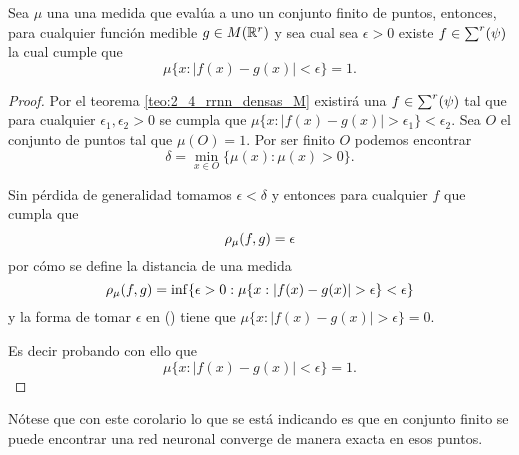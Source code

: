 \begin{corolario} \label{corolario:2_4_conjunto_finito}
    Sea $\mu$ una una medida que evalúa a uno un conjunto 
    finito de puntos, 
    entonces, para cualquier función medible $g \in M(\mathbb{R}^r)$
    y sea cual sea $\epsilon >0$ 
    existe $f \in \sum^r (\psi)$ la cual cumple que 
    \begin{equation}
        \mu\{ 
            x:
            |f(x) - g(x)| 
            < \epsilon
        \}
        = 1.
    \end{equation}

\end{corolario}
\begin{proof}
    Por el teorema \ref{teo:2_4_rrnn_densas_M} existirá una 
    $f \in \sum^r (\psi)$ tal que para cualquier 
    $\epsilon_1, \epsilon_2 >0$ se cumpla que 
    $\mu \{x: |f(x) - g(x)| > \epsilon_1\} < \epsilon_2.$
    Sea $O$ el conjunto de puntos tal que $\mu(O) = 1.$
    Por ser finito $O$ podemos encontrar
    \begin{equation} \label{eq:2_4:definición_epsilon}
        \delta = \min_{x \in O} \{ 
            \mu(x) : \mu(x)>0
        \}. 
    \end{equation}

    Sin pérdida de generalidad tomamos $\epsilon < \delta$ y entonces
    para cualquier $f$ que cumpla que 
    \begin{equation}
        \rho_{\mu}(f,g) = \epsilon
    \end{equation}
    por cómo se define la distancia de una medida
    \begin{equation}
        \rho_{\mu}(f,g) =  \inf 
        \{
           \epsilon > 0:
           \mu\{ 
            x:
            |f(x) - g(x)| 
            > \epsilon
        \}
        < \epsilon
        \}
    \end{equation}
    y la forma de tomar $\epsilon$ en () 
    tiene que $\mu\{ 
        x:
        |f(x) - g(x)| 
        > \epsilon
    \} = 0.$

    Es decir probando con ello que 
    \begin{equation}
        \mu\{ 
            x:
            |f(x) - g(x)| 
            < \epsilon
        \}
        = 1.
    \end{equation}
\end{proof}

Nótese que con este corolario lo que se está indicando es que en 
conjunto finito se puede encontrar una red neuronal
converge de manera exacta en esos puntos. 


